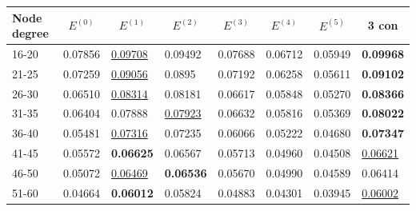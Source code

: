 \begin{table}[]
    \centering
    \begin{tabular}{|l|l|l|l|l|l|l||l|}
        \hline
        Node degree & \multicolumn{1}{c|}{$E^{(0)}$} & \multicolumn{1}{c|}{$E^{(1)}$} & \multicolumn{1}{c|}{$E^{(2)}$} & \multicolumn{1}{c|}{$E^{(3)}$} & \multicolumn{1}{c|}{$E^{(4)}$} & \multicolumn{1}{c|}{$E^{(5)}$} & \multicolumn{1}{c|}{3 con} \\ \hline
        16-20       & 0.07856                        & \underline{0.09708}            & 0.09492                        & 0.07688                        & 0.06712                        & 0.05949                        & \textbf{0.09968}           \\ \hline
        21-25       & 0.07259                        & \underline{0.09056}            & 0.0895                         & 0.07192                        & 0.06258                        & 0.05611                        & \textbf{0.09102}           \\ \hline
        26-30       & 0.06510                        & \underline{0.08314}            & 0.08181                        & 0.06617                        & 0.05848                        & 0.05270                        & \textbf{0.08366}           \\ \hline
        31-35       & 0.06404                        & 0.07888                        & \underline{0.07923}            & 0.06632                        & 0.05816                        & 0.05369                        & \textbf{0.08022}           \\ \hline
        36-40       & 0.05481                        & \underline{0.07316}            & 0.07235                        & 0.06066                        & 0.05222                        & 0.04680                        & \textbf{0.07347}           \\ \hline
        41-45       & 0.05572                        & \textbf{0.06625}               & 0.06567                        & 0.05713                        & 0.04960                        & 0.04508                        & \underline{0.06621}        \\ \hline
        46-50       & 0.05072                        & \underline{0.06469}            & \textbf{0.06536}               & 0.05670                        & 0.04990                        & 0.04589                        & 0.06414                    \\ \hline
        51-60       & 0.04664                        & \textbf{0.06012}               & 0.05824                        & 0.04883                        & 0.04301                        & 0.03945                        & \underline{0.06002}        \\ \hline

\end{tabular}
\end{table}
